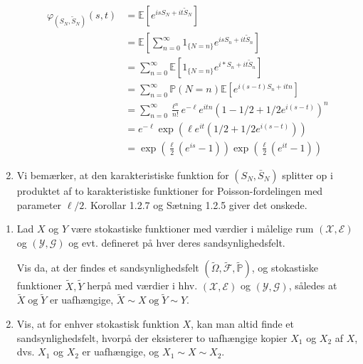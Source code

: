 \documentclass{Class}
\newcommand{\1}{\mathbbm{1}}
\theoremstyle{boxed}
\begin{document}
\begin{enumerate}
  $$
  \begin{aligned}
  \varphi_{\left(S_N, \tilde{S}_N\right)}(s, t) & =\mathbb{E}\left[e^{i s S_N+i t \tilde{S}_N}\right] \\
  & =\mathbb{E}\left[\sum_{n=0}^{\infty} 1_{\{N=n\}} e^{i s S_n+i t \tilde{S}_n}\right] \\
  & =\sum_{n=0}^{\infty} \mathbb{E}\left[1_{\{N=n\}} e^{i * S_n+i t \tilde{S}_n}\right] \\
  & =\sum_{n=0}^{\infty} \mathbb{P}(N=n) \mathbb{E}\left[e^{i(s-t) S_n+i t n}\right] \\
  & =\sum_{n=0}^{\infty} \frac{\ell^n}{n!} e^{-\ell} e^{i t n}\left(1-1 / 2+1 / 2 e^{i(s-t)}\right)^n \\
  & =e^{-\ell} \exp \left(\ell e^{i t}\left(1 / 2+1 / 2 e^{i(s-t)}\right)\right) \\
  & =\exp \left(\frac{\ell}{2}\left(e^{i s}-1\right)\right) \exp \left(\frac{\ell}{2}\left(e^{i t}-1\right)\right)
  \end{aligned}
  $$
  \item Vi bemærker, at den karakteristiske funktion for $\left(S_N, \bar{S}_N\right)$ splitter op i produktet af to karakteristiske funktioner for Poisson-fordelingen med parameter $\ell / 2$. Korollar 1.2.7 og Sætning 1.2.5 giver det onskede.
\end{enumerate}
\begin{enumerate}
  \item Lad $X$ og $Y$ være stokastiske funktioner med værdier i målelige rum $(\mathcal{X}, \mathcal{E})$ og $(\mathcal{Y}, \mathcal{G})$ og evt. defineret på hver deres sandsynlighedsfelt.

  Vis da, at der findes et sandsynlighedsfelt $(\tilde{\Omega}, \tilde{\mathcal{F}}, \tilde{\mathbb{P}})$, og stokastiske funktioner $\tilde{X}, \tilde{Y}$ herpå med værdier i hhv. $(\mathcal{X}, \mathcal{E})$ og $(\mathcal{Y}, \mathcal{G})$, således at $\tilde{X} \operatorname{og} \tilde{Y}$ er uafhængige, $\tilde{X} \sim X \operatorname{og} \tilde{Y} \sim Y$.
  \item Vis, at for enhver stokastisk funktion $X$, kan man altid finde et sandsynlighedsfelt, hvorpå der eksisterer to uafhængige kopier $X_1$ og $X_2$ af $X$, dvs. $X_1$ og $X_2$ er uafhængige, og $X_1 \sim X \sim X_2$.
\end{enumerate}
\solution
\end{document}
